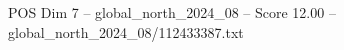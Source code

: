 \begin{textsample}{POS Dim 7 – global\_north\_2024\_08 – Score 12.00 – global\_north\_2024\_08/112433387.txt}
\end{textsample}
